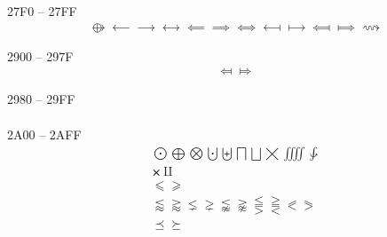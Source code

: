 \documentclass[twoside, 10pt]{article}
\begin{document}
        27F0 -- 27FF
        \begin{align}
            & ⟴ ⟵ ⟶ ⟷ ⟸ ⟹ ⟺ ⟻ ⟼ ⟽ ⟾ ⟿
        \end{align}

        2900 -- 297F
        \begin{align}
            & ⤆ ⤇
        \end{align}

        2980 -- 29FF
        \begin{align}
            &
        \end{align}

        2A00 -- 2AFF
        \begin{align}
            & ⨀ ⨁ ⨂ ⨃ ⨄ ⨅ ⨆ ⨉ ⨌ ⨑\\
            & ⨯ ⨿ \\
            & ⩽ ⩾ \\
            & ⪅ ⪆ ⪇ ⪈ ⪉ ⪊ ⪋ ⪌ ⪕ ⪖ \\
            & ⪯ ⪰
        \end{align}
\end{document}
